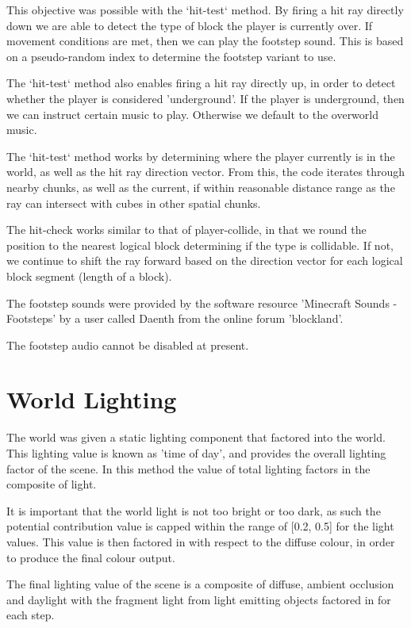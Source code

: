 \documentclass{book}
\begin{document}
This objective was possible with the `hit-test` method.  By firing a hit ray directly down we are able to detect the type of block the player is currently over.  If movement conditions are met, then we can play the footstep sound.  This is based on a pseudo-random index to determine the footstep variant to use.
    
The `hit-test` method also enables firing a hit ray directly up, in order to detect whether the player is considered 'underground'.  If the player is underground, then we can instruct certain music to play.  Otherwise we default to the overworld music.
    
The `hit-test` method works by determining where the player currently is in the world, as well as the hit ray direction vector.  From this, the code iterates through nearby chunks, as well as the current, if within reasonable distance range as the ray can intersect with cubes in other spatial chunks.
    
The hit-check works similar to that of player-collide, in that we round the position to the nearest logical block determining if the type is collidable.  If not, we continue to shift the ray forward based on the direction vector for each logical block segment (length of a block).
    
The footstep sounds were provided by the software resource 'Minecraft Sounds - Footsteps' by a user called Daenth from the online forum 'blockland'.
    
The footstep audio cannot be disabled at present.
    
\section{World Lighting}
The world was given a static lighting component that factored into the world.  This lighting value is known as 'time of day', and provides the overall lighting factor of the scene.  In this method the value of total lighting factors in the composite of light.
    
It is important that the world light is not too bright or too dark, as such the potential contribution value is capped within the range of [0.2, 0.5] for the light values.  This value is then factored in with respect to the diffuse colour, in order to produce the final colour output.
    
The final lighting value of the scene is a composite of diffuse, ambient occlusion and daylight with the fragment light from light emitting objects factored in for each step. 
    
\end{document}
